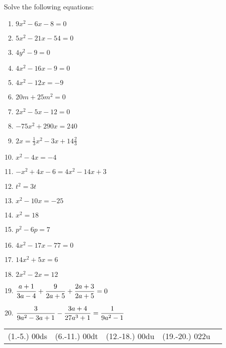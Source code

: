 \begin{exercises}{}
{Solve the following equations:
\begin{multicols}{2}
\begin{enumerate}[itemsep=5pt, label=\textbf{\arabic*}. ] 
\item  $9x^{2}-6x-8=0$%
\item  $5x^{2}-21x-54=0$%
\item  $4y^{2}-9=0$%
\item  $4x^{2}-16x-9=0$%
\item  $4x^{2}-12x=-9$%
\item  $20m+25{m}^{2}=0$
\item  $2{x}^{2}-5x-12=0$  
\item  $-75{x}^{2}+290x=240$
\item  $2x=\frac{1}{3}{x}^{2}-3x+14\frac{2}{3}$
\item  ${x}^{2}-4x=-4$      
\item  $-{x}^{2}+4x-6=4{x}^{2}-14x+3$       
\item  ${t}^{2}=3t$  
\item  ${x}^{2}-10x=-25$      
\item  ${x}^{2}=18$
\item  ${p}^{2}-6p=7$
\item  $4{x}^{2}-17x-77=0$
\item  $14{x}^{2}+5x=6$
\item  $2{x}^{2}-2x=12$  
\item  $\dfrac{a+1}{3a-4}+\dfrac{9}{2a+5}\\[4pt]+\dfrac{2a+3}{2a+5}=0$
\item  $\dfrac{3}{9a^2-3a+1}-\dfrac{3a+4}{27a^3+1}\\[4pt]=\dfrac{1}{9a^2-1}$          
\end{enumerate}
\end{multicols}
\practiceinfo
\par 
\par\begin{tabular}[h]{ccccc}
(1.-5.) 00ds&  (6.-11.) 00dt&  (12.-18.) 00du & (19.-20.) 022u &\end{tabular}
}
\end{exercises}

